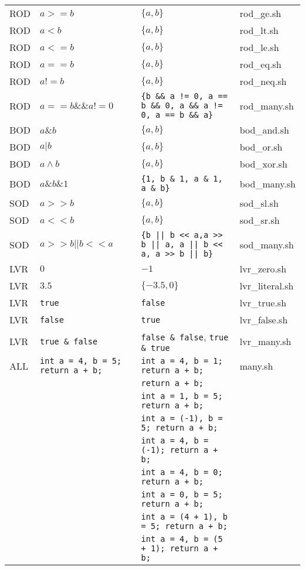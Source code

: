 \begin{longtable}{|p{1cm}|p{5cm}|p{6cm}|p{2.5cm}|}
ROD	&	$a>=b$	&	$\{a, b\}$	&	rod\_ge.sh \\
ROD	&	$a<b$	&	$\{a, b\}$	&	rod\_lt.sh \\
ROD	&	$a<=b$	&	$\{a, b\}$	&	rod\_le.sh \\
ROD	&	$a==b$	&	$\{a, b\}$	&	rod\_eq.sh \\
ROD	&	$a!=b$	&	$\{a, b\}$	&	rod\_neq.sh \\
ROD	&	$a == b \&\& a != 0$	&	\texttt{\{b \&\& a != 0, a == b \&\&  0, a  \&\& a != 0, a == b \&\& a\}}	&	rod\_many.sh \\
BOD	&	$a\&b$	&	$\{a, b\}$	&	bod\_and.sh \\
BOD	&	$a|b$	&	$\{a, b\}$	&	bod\_or.sh \\
BOD	&	$a \land b$	&	$\{a, b\}$	&	bod\_xor.sh \\
BOD	&	$a \& b \& 1$	&	\texttt{\{1, b \& 1, a \& 1, a \& b\}}	&	bod\_many.sh \\
SOD	&	$a>>b$	&	$\{a, b\}$	&	sod\_sl.sh \\
SOD	&	$a<<b$	&	$\{a, b\}$	&	sod\_sr.sh \\
SOD	&	$a >> b || b << a$	&	\texttt{\{b || b << a,a >> b || a, a || b << a, a >> b || b\}}	&	sod\_many.sh \\
LVR	&	$0$	&	$-1$	&	lvr\_zero.sh \\
LVR	&	$3.5$	&	$\{-3.5, 0\}$	&	lvr\_literal.sh \\
LVR	&	\texttt{true}	&	\texttt{false}	&	lvr\_true.sh \\
LVR	&	\texttt{false}	&	\texttt{true}	&	lvr\_false.sh \\
LVR	&	\texttt{true \& false}	&	\texttt{false \& false}, \texttt{true \& true}	&	lvr\_many.sh \\
ALL	&	\texttt{int a = 4, b = 5; return a + b;}	&	\texttt{int a = 4, b = 1; return a + b;}	&	many.sh \\
& & \texttt{return a + b;} & \\
& & \texttt{int a = 1, b = 5; return a + b;} & \\
& & \texttt{int a = (-1), b = 5; return a + b;} & \\
& & \texttt{int a = 4, b = (-1); return a + b;} & \\
& & \texttt{int a = 4, b = 0; return a + b;} & \\
& & \texttt{int a = 0, b = 5; return a + b;} & \\
& & \texttt{int a = (4 + 1), b = 5; return a + b;} & \\
& & \texttt{int a = 4, b = (5 + 1); return a + b;} & \\

\end{longtable}
